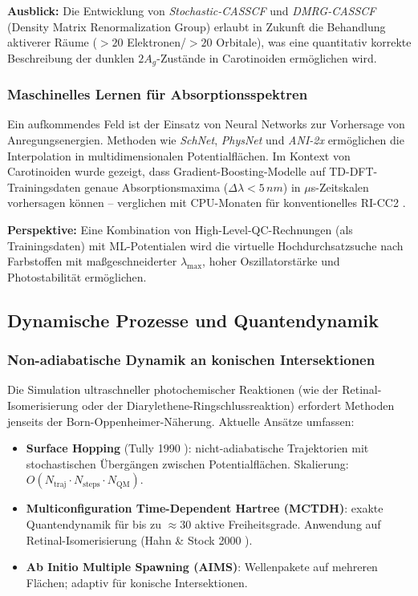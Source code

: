 ﻿\documentclass[a4paper,12pt]{article}
\theoremstyle{definition}
\begin{document}
\textbf{Ausblick:} Die Entwicklung von \emph{Stochastic-CASSCF} und
\emph{DMRG-CASSCF} (Density Matrix Renormalization Group) erlaubt in Zukunft
die Behandlung aktiverer Räume ($> 20$ Elektronen/$> 20$ Orbitale),
was eine quantitativ korrekte Beschreibung der dunklen $2A_g$-Zustände in
Carotinoiden ermöglichen wird.

\subsubsection{Maschinelles Lernen für Absorptionsspektren}

Ein aufkommendes Feld ist der Einsatz von Neural Networks zur Vorhersage von
Anregungsenergien. Methoden wie \emph{SchNet}, \emph{PhysNet} und
\emph{ANI-2x} ermöglichen die Interpolation in multidimensionalen
Potentialflächen. Im Kontext von Carotinoiden wurde gezeigt, dass
Gradient-Boosting-Modelle auf TD-DFT-Trainingsdaten genaue
Absorptionsmaxima ($\Delta\lambda < 5\,\si{nm}$) in $\mu$s-Zeitskalen
vorhersagen können -- verglichen mit CPU-Monaten für konventionelles RI-CC2
\cite{zurek2021}.

\textbf{Perspektive:} Eine Kombination von High-Level-QC-Rechnungen
(als Trainingsdaten) mit ML-Potentialen wird die virtuelle
Hochdurchsatzsuche nach Farbstoffen mit maßgeschneiderter $\lambda_{\max}$,
hoher Oszillatorstärke und Photostabilität ermöglichen.

\subsection{Dynamische Prozesse und Quantendynamik}

\subsubsection{Non-adiabatische Dynamik an konischen Intersektionen}

Die Simulation ultraschneller photochemischer Reaktionen (wie der Retinal-Isomerisierung
oder der Diarylethene-Ringschlussreaktion) erfordert Methoden jenseits der
Born-Oppenheimer-Näherung. Aktuelle Ansätze umfassen:
\begin{itemize}
  \item \textbf{Surface Hopping} (Tully 1990 \cite{tully1990}): nicht-adiabatische
        Trajektorien mit stochastischen Übergängen zwischen Potentialflächen.
        Skalierung: $O(N_\mathrm{traj} \cdot N_\mathrm{steps} \cdot N_\mathrm{QM})$.
  \item \textbf{Multiconfiguration Time-Dependent Hartree (MCTDH)}:
        exakte Quantendynamik für bis zu $\approx 30$ aktive Freiheitsgrade.
        Anwendung auf Retinal-Isomerisierung (Hahn \& Stock 2000 \cite{hahn2000}).
  \item \textbf{Ab Initio Multiple Spawning (AIMS)}: Wellenpakete auf mehreren
        Flächen; adaptiv für konische Intersektionen.
\end{itemize}
\end{document}
